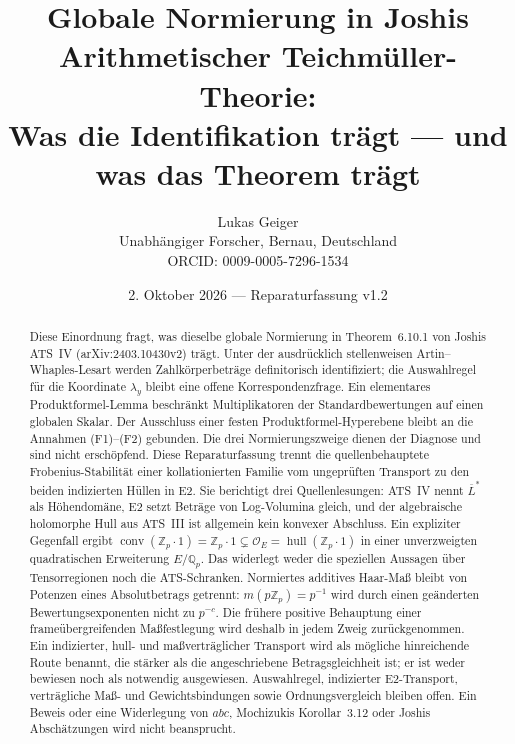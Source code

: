 \documentclass[11pt,a4paper]{article}
\title{Globale Normierung in Joshis Arithmetischer Teichmüller-Theorie:\\
Was die Identifikation trägt --- und was das Theorem trägt}
\author{Lukas Geiger\\[2pt]
\small Unabhängiger Forscher, Bernau, Deutschland\\
\small ORCID: 0009-0005-7296-1534}
\date{2. Oktober 2026 --- Reparaturfassung v1.2}
\theoremstyle{definition}
\theoremstyle{plain}
\theoremstyle{definition}
\begin{document}
\maketitle

\begin{abstract}
\noindent
Diese Einordnung fragt, was dieselbe globale Normierung in
Theorem~6.10.1 von Joshis ATS~IV (arXiv:2403.10430v2) trägt. Unter der ausdrücklich
stellenweisen Artin--Whaples-Lesart werden Zahlkörperbeträge definitorisch
identifiziert; die Auswahlregel für die Koordinate $\lambda_y$ bleibt eine offene
Korrespondenzfrage. Ein elementares Produktformel-Lemma beschränkt Multiplikatoren
der Standardbewertungen auf einen globalen Skalar. Der Ausschluss einer festen
Produktformel-Hyperebene bleibt an die Annahmen (F1)--(F2) gebunden.
Die drei Normierungszweige dienen der Diagnose und sind nicht erschöpfend.
Diese Reparaturfassung trennt die quellenbehauptete Frobenius-Stabilität einer
kollationierten Familie vom ungeprüften Transport zu den beiden indizierten
Hüllen in E2. Sie berichtigt drei Quellenlesungen: ATS~IV nennt
$\overline L^*$ als Höhendomäne, E2 setzt Beträge von Log-Volumina gleich,
und der algebraische holomorphe Hull aus ATS~III ist allgemein kein konvexer
Abschluss. Ein expliziter Gegenfall ergibt
$\operatorname{conv}(\mathbb Z_p\cdot1)=\mathbb Z_p\cdot1
\subsetneq\mathcal O_E=\operatorname{hull}(\mathbb Z_p\cdot1)$ in einer
unverzweigten quadratischen Erweiterung $E/\mathbb Q_p$. Das widerlegt weder
die speziellen Aussagen über Tensorregionen noch die ATS-Schranken.
Normiertes additives Haar-Maß bleibt von Potenzen eines Absolutbetrags getrennt:
$m(p\mathbb Z_p)=p^{-1}$ wird durch einen geänderten Bewertungsexponenten
nicht zu $p^{-c}$. Die frühere positive Behauptung einer frameübergreifenden
Maßfestlegung wird deshalb in jedem Zweig zurückgenommen.
Ein indizierter, hull- und maßverträglicher Transport wird als mögliche
hinreichende Route benannt, die stärker als die angeschriebene Betragsgleichheit
ist; er ist weder bewiesen noch als notwendig ausgewiesen. Auswahlregel,
indizierter E2-Transport, verträgliche Maß- und Gewichtsbindungen sowie
Ordnungsvergleich bleiben offen. Ein Beweis oder eine Widerlegung von $abc$,
Mochizukis Korollar~3.12 oder Joshis Abschätzungen wird nicht beansprucht.
\end{abstract}
\end{document}
